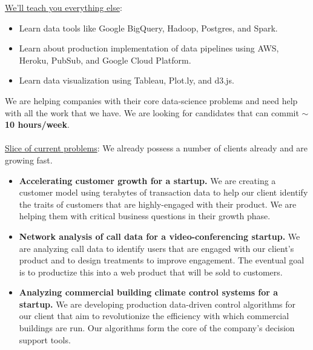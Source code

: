 \documentclass[11pt]{article}
\begin{document}
\begin{titlepage}
\noindent \underline{We'll teach you everything else}:
\begin{itemize}
	\item Learn data tools like Google BigQuery, Hadoop, Postgres, and Spark.  
	\item Learn about production implementation of data pipelines using AWS, Heroku, PubSub, and Google Cloud Platform. 
	\item Learn data visualization using Tableau, Plot.ly, and d3.js.  
\end{itemize}

\noindent We are helping companies with their core data-science problems and need help with all the work that we have.  We are looking for candidates that can commit $\sim$\textbf{10 hours/week}.  
\\
\\
\noindent \underline{Slice of current problems}: We already possess a number of clients already and are growing fast.  

\begin{itemize}

	\item \textbf{Accelerating customer growth for a startup.}  We are creating a customer model using terabytes of transaction data to help our client identify the traits of customers that are highly-engaged with their product. We are helping them with critical business questions in their growth phase.
 
	\item \textbf{Network analysis of call data for a video-conferencing startup.}  We are analyzing call data to identify users that are engaged with our client's product and to design treatments to improve engagement. The eventual goal is to productize this into a web product that will be sold to customers.
	   
	\item \textbf{Analyzing commercial building climate control systems for a startup.}  We are developing production data-driven control algorithms for our client that aim to revolutionize the efficiency with which commercial buildings are run. Our algorithms form the core of the company’s decision support tools.  %
	
\end{itemize}



\end{titlepage}


\newpage





\end{document}
